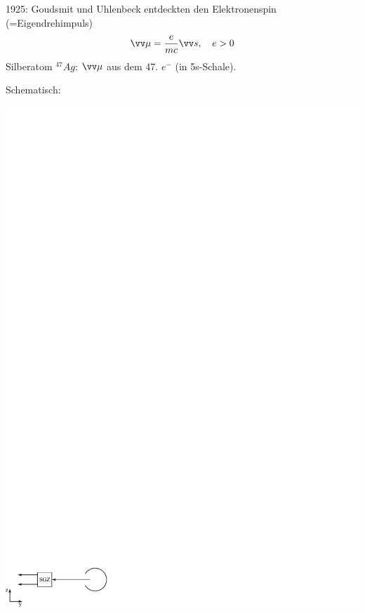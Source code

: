 \documentclass[a4paper]{scrartcl}
\begin{document}
{1925: Goudsmit und Uhlenbeck entdeckten den Elektronenspin (=Eigendrehimpuls)
\begin{align}
\vv \mu  = \frac{e}{mc} \vv s, \quad e>0
\end{align}
Silberatom $^{47}Ag$: $\vv \mu$ aus dem 47. $e^-$ (in 5s-Schale).

Schematisch:
\begin{center}
\includegraphics{057SGZ1}
\end{center}

}
\end{document}

